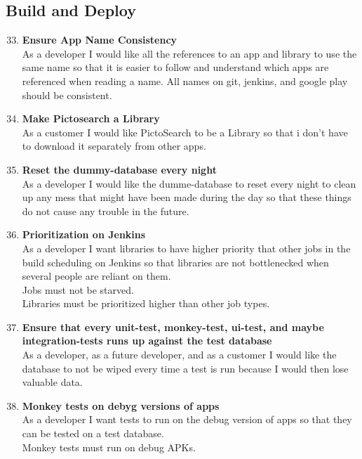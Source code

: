 \subsection{Build and Deploy}

\begin{enumerate}
	\setcounter{enumi}{32} %
	\item \textbf{Ensure App Name Consistency}\\
	As a developer I would like all the references to an app and library to use the same name so that it is easier to follow and understand which apps are referenced when reading a name. All names on git, jenkins, and google play should be consistent.
	
	\item \textbf{Make Pictosearch a Library}\\
	As a customer I would like PictoSearch to be a Library so that i don’t have to download it separately from other apps.
	
	\item \textbf{Reset the dummy-database every night}\\
	As a developer I would like the dumme-database to reset every night to clean up any mess that might have been made during the day so that these things do not cause any trouble in the future.
	
	\item \textbf{Prioritization on Jenkins}\\
	As a developer I want libraries to have higher priority that other jobs in the build scheduling on Jenkins so that libraries are not bottlenecked when several people are reliant on them.\\
	Jobs must not be starved.\\
	Libraries must be prioritized higher than other job types.
	
	\item \textbf{Ensure that every unit-test, monkey-test, ui-test, and maybe integration-tests runs up against the test database}\\
	As a developer, as a future developer, and as a customer I would like the database to not be wiped every time a test is run because I would then lose valuable data.\\
	
	\item \textbf{Monkey tests on debyg versions of apps}\\
	As a developer I want tests to run on the debug version of apps so that they can be tested on a test database.\\
	Monkey tests must run on debug APKs.
	

\end{enumerate}
